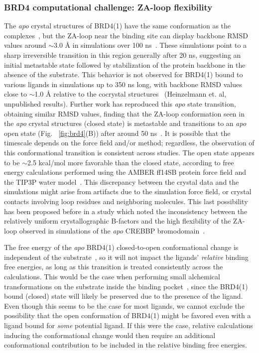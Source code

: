 \documentclass[aps,pre,twocolumn,nofootinbib,superscriptaddress,10pt, final,tightenlines]{revtex4-1}
\begin{document}
\subsubsection{BRD4 computational challenge: ZA-loop flexibility}


The \emph{apo} crystal structures of BRD4(1) have the same conformation as the complexes~\cite{Lucas:2013:Angew.Chem.Int.Ed., Filippa:2012:Cell}, but the ZA-loop near the binding site can display backbone RMSD values around $\sim$3.0 {\AA} in simulations over 100 ns~\cite{Kuang:2015:J.Chem.Inf.Model., Steiner:2013:FEBSLett.}.
These simulations point to a sharp irreversible transition in this region generally after 20 ns, suggesting an initial metastable state followed by stabilization of the protein backbone in the absence of the substrate. 
This behavior is not observed for BRD4(1) bound to various ligands in simulations up to 350 ns long, with backbone RMSD values close to $\sim$1.0 {\AA} relative to the cocrystal structures~\cite{Su:2017:J.Biomol.Struct.Dyn.} (Heinzelmann et. al, unpublished results). 
Further work has reproduced this \emph{apo} state transition, obtaining similar RMSD values, finding that the ZA-loop conformation seen in the \emph{apo} crystal structures (closed state) is metastable and transitions to an \emph{apo} open state (Fig. ~\ref{fig:brd4}(B)) after around 50 ns~\cite{Heinzelmann:2017:J.Chem.TheoryComput.}. 
It is possible that the timescale depends on the force field and/or method; regardless, the observation of this conformational transition is consistent across studies.
The open state appears to be $\sim$2.5 kcal/mol more favorable than the closed state, according to free energy calculations performed using the AMBER ff14SB protein force field and the TIP3P water model~\cite{Heinzelmann:2017:J.Chem.TheoryComput.}. 
This discrepancy between the crystal data and the simulations might arise from artifacts due to the simulation force field, or crystal contacts involving loop residues and neighboring molecules. 
This last possibility has been proposed before in a study which noted the inconsistency between the relatively uniform crystallographic B-factors and the high flexibility of the ZA-loop observed in simulations of the \emph{apo} CREBBP bromodomain~\cite{Spilio:2014:Isr.J.Chem.}. 

The free energy of the \emph{apo} BRD4(1) closed-to-open conformational change is independent of the substrate~\cite{Heinzelmann:2017:J.Chem.TheoryComput.}, so it will not impact the ligands' \emph{relative} binding free energies, as long as this transition is treated consistently across the calculations. 
This would be the case when performing small alchemical transformations on the substrate inside the binding pocket~\cite{schrodinger_accurate_2015}, since the BRD4(1) bound (closed) state will likely be preserved due to the presence of the ligand.
Even though this seems to be the case for most ligands, we cannot exclude the possibility that the open conformation of BRD4(1) might be favored even with a ligand bound for \emph{some} potential ligand.
If this were the case, relative calculations inducing the conformational change would then require an additional conformational contribution to be included in the relative binding free energies.
\end{document}
